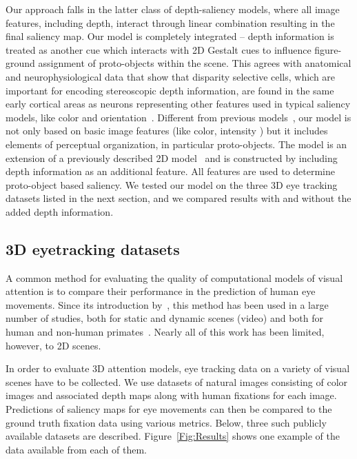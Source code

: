 Our approach falls in the latter class of depth-saliency models, where all image features, including depth, interact through linear combination resulting in the final saliency map. Our model is completely integrated -- depth information is treated as another cue which interacts with 2D Gestalt cues to influence figure-ground assignment of proto-objects within the scene. This agrees with anatomical and neurophysiological data that show that disparity selective cells, which are important for encoding stereoscopic depth information, are found in the same early cortical areas as neurons representing other features used in typical saliency models, like color and orientation~\citep{Hubel_Wiesel62,Poggio_etal88b}. Different
from previous models~\citep{Ouerhani_etal00,Jost_etal04,Hugli_etal05}, our model is not only based on basic image features (like color, intensity \etc) but it includes elements of perceptual organization, in particular proto-objects. The model is an extension of a previously described 2D model~\citep{Russell_etal14} and is constructed by including depth information as an additional feature. All features are used to determine proto-object based saliency. We tested our model on the three 3D eye tracking datasets listed in the next section, and we compared results with and without the added depth information.

\subsection{3D eyetracking datasets}
A common method for evaluating the quality of computational models of visual attention is to compare their performance in the prediction of human eye movements. Since its introduction by~\cite{Parkhurst_etal02a}, this method has been used in a large number of studies, both for static and dynamic scenes (video) and both for human and non-human primates~\citep[for a recent review see][]{Borji_Itti13}. Nearly all of this work has been limited, however, to 2D scenes.

In order to evaluate 3D attention models, eye tracking data on a variety of visual scenes have to be collected. We use datasets of natural images consisting of color images and associated depth maps along with human fixations for each image.  Predictions of saliency maps for eye movements can then be compared to the ground truth fixation data using various metrics. Below, three such publicly available datasets are described. Figure~\ref{Fig:Results} shows one example of the data available from each of them. 


